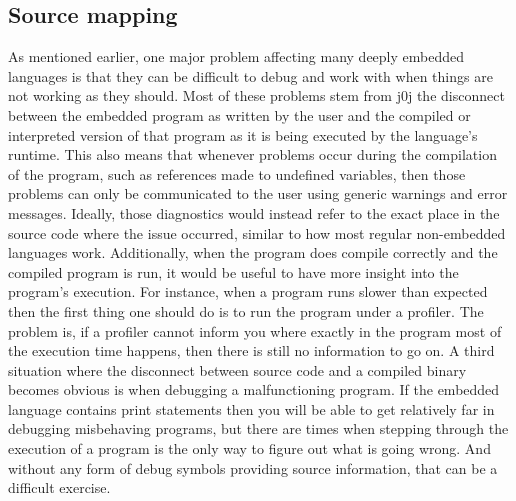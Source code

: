 \documentclass[fontsize=11pt,a4paper,parskip=half,numbers=noenddot]{scrartcl}
\newcommand{\hask}[1]{\texttt{#1}}
\begin{document}
\subsection{Source mapping}\label{sec:source-mapping}


As mentioned earlier, one major problem affecting many deeply embedded languages
is that they can be difficult to debug and work with when things are not working
as they should. Most of these problems stem from j0j the disconnect between the
embedded program as written by the user and the compiled or interpreted version
of that program as it is being executed by the language's runtime. This also
means that whenever problems occur during the compilation of the program, such
as references made to undefined variables, then those problems can only be
communicated to the user using generic warnings and error messages. Ideally,
those diagnostics would instead refer to the exact place in the source code
where the issue occurred, similar to how most regular non-embedded languages
work. Additionally, when the program does compile correctly and the compiled
program is run, it would be useful to have more insight into the program's
execution. For instance, when a program runs slower than expected then the first
thing one should do is to run the program under a profiler. The problem is, if a
profiler cannot inform you where exactly in the program most of the execution
time happens, then there is still no information to go on. A third situation
where the disconnect between source code and a compiled binary becomes obvious
is when debugging a malfunctioning program. If the embedded language contains
print statements then you will be able to get relatively far in debugging
misbehaving programs, but there are times when stepping through the execution of
a program is the only way to figure out what is going wrong. And without any
form of debug symbols providing source information, that can be a difficult
exercise.
\end{document}
